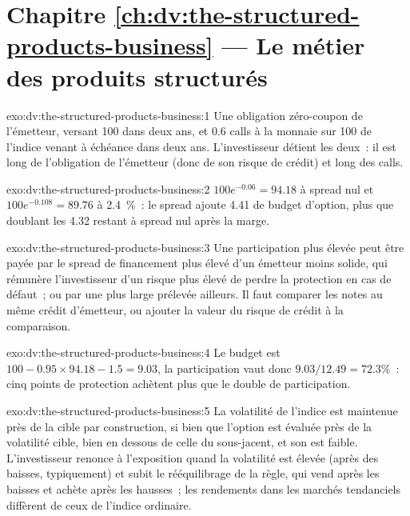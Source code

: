 \section*{Chapitre \ref{ch:dv:the-structured-products-business} --- Le métier des produits structurés}

\begin{solution}{exo:dv:the-structured-products-business:1}
Une obligation zéro-coupon de l'émetteur, versant 100 dans deux ans, et 0.6 calls à la monnaie sur 100 de l'indice venant à échéance dans deux ans.
L'investisseur détient les deux~: il est long de l'obligation de l'émetteur (donc de son risque de crédit) et long des calls.
\end{solution}

\begin{solution}{exo:dv:the-structured-products-business:2}
$100e^{-0.06}=94.18$ à spread nul et $100e^{-0.108}=89.76$ à 2.4~\%~: le spread ajoute 4.41 de budget d'option, plus que doublant
les 4.32 restant à spread nul après la marge.
\end{solution}

\begin{solution}{exo:dv:the-structured-products-business:3}
Une participation plus élevée peut être payée par le spread de financement plus élevé d'un émetteur moins solide, qui rémunère l'investisseur d'un risque
plus élevé de perdre la protection en cas de défaut~; ou par une  plus large prélevée ailleurs. Il faut comparer les notes au même crédit d'émetteur, ou ajouter la
valeur du risque de crédit à la comparaison.
\end{solution}

\begin{solution}{exo:dv:the-structured-products-business:4}
Le budget est $100-0.95\times94.18-1.5=9.03$, la participation vaut donc $9.03/12.49=72.3\%$~: cinq points de protection achètent plus
que le double de participation.
\end{solution}

\begin{solution}{exo:dv:the-structured-products-business:5}
La volatilité de l'indice est maintenue près de la cible par construction, si bien que l'option est évaluée près de la volatilité cible, bien en dessous de
celle du sous-jacent, et son  est faible. L'investisseur renonce à l'exposition quand la volatilité est élevée (après des baisses, typiquement) et subit
le rééquilibrage de la règle, qui vend après les baisses et achète après les hausses~; les rendements dans les marchés tendanciels diffèrent de ceux de l'indice ordinaire.
\end{solution}

